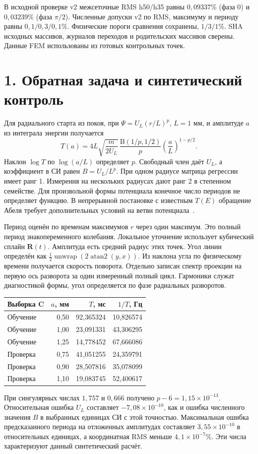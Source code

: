 \documentclass[11pt,a4paper]{article}
\newcommand{\R}{\mathbf R}
\newcommand{\e}[1]{\times10^{#1}}
\begin{document}
В исходной проверке v2 межсеточные RMS h50/h35 равны $0{,}09337\%$ (фаза 0)
и $0{,}03239\%$ (фаза $\pi/2$). Численные допуски v2 по RMS, максимуму
и периоду равны $0{,}1/0{,}3/0{,}1\%$. Физические пороги сравнения
сохранены, $1/3/1\%$. SHA исходных массивов, журналов переходов и родительских
массивов сверены. Данные FEM использованы из готовых контрольных точек.

\newpage
\section*{1. Обратная задача и синтетический контроль}
Для радиального старта из покоя, при $\Psi=U_L(r/L)^p$, $L=1$ мм, и амплитуде
$a$ из интеграла энергии получается
\[
T(a)=4L\sqrt{\frac{m}{2U_L}}\,
\frac{\mathrm B(1/p,1/2)}{p}\left(\frac{a}{L}\right)^{1-p/2}.
\]
Наклон $\log T$ по $\log(a/L)$ определяет $p$. Свободный член даёт $U_L$,
а коэффициент в СИ равен $B=U_L/L^p$. При одном радиусе матрица регрессии
имеет ранг 1. Измерения на нескольких радиусах дают ранг 2 в степенном
семействе. Для произвольной формы потенциала конечное число периодов не
определяет функцию. В непрерывной постановке с известным $T(E)$ обращение
Абеля требует дополнительных условий на ветви потенциала~\cite{tautochrone}.

Период оценён по временам максимумов $r$ через один максимум. Это полный
период знакопеременного колебания. Локальное уточнение использует кубический
сплайн $\R(t)$. Амплитуда есть средний радиус этих точек. Угол линии
определён как $\tfrac12\operatorname{unwrap}(2\operatorname{atan2}(y,x))$.
Из наклона угла по физическому времени получается скорость поворота.
Отдельно записан спектр проекции на первую ось разворота за один измеренный
полный цикл. Гармоники служат диагностикой формы, угол определяется по
фазе радиальных разворотов.

\begin{center}
\begin{tabular}{@{}lrrr@{}}
\toprule
Выборка C & $a$, мм & $T$, мс & $1/T$, Гц \\
\midrule
Обучение & 0,50 & 92,365324 & 10,826574 \\
Обучение & 1,00 & 23,091331 & 43,306295 \\
Обучение & 1,25 & 14,778452 & 67,666086 \\
Проверка & 0,75 & 41,051255 & 24,359791 \\
Проверка & 0,90 & 28,507816 & 35,078099 \\
Проверка & 1,10 & 19,083745 & 52,400617 \\
\bottomrule
\end{tabular}
\end{center}
При сингулярных числах $1{,}757$ и $0{,}666$ получено $p-6=1{,}15\e{-13}$.
Относительная ошибка $U_L$ составляет $-7{,}08\e{-10}$, как и ошибка
численного значения $B$ в выбранных единицах СИ с этой точностью.
Максимальная ошибка предсказанного периода на отложенных амплитудах
составляет $3{,}55\e{-10}$ в относительных единицах, а координатная RMS
меньше $4{,}1\e{-7}\%$. Эти числа характеризуют данный синтетический расчёт.
\end{document}
